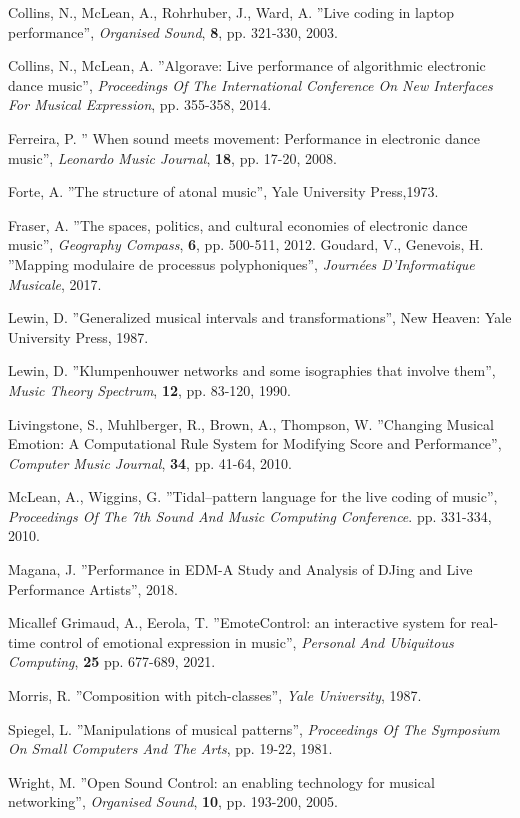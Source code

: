 \documentclass{article}
\begin{document}
\begin{thebibliography}{2}
  Collins, N., McLean, A., Rohrhuber, J., Ward, A. ''Live coding in laptop performance'',
  {\em Organised Sound}, \textbf{8}, pp. 321-330, 2003.

  Collins, N., McLean, A. 
  ''Algorave: Live performance of algorithmic electronic dance music'',
  {\em Proceedings Of The International Conference On New Interfaces For Musical Expression}, pp. 355-358, 2014.

  Ferreira, P.
  '' When sound meets movement: Performance in electronic dance music'',
   {\em Leonardo Music Journal}, \textbf{18}, pp. 17-20, 2008.

  Forte, A.
  ''The structure of atonal music'',
  Yale University Press,1973.

  Fraser, A. 
  ''The spaces, politics, and cultural economies of electronic dance music'', {\em Geography Compass}, \textbf{6}, pp. 500-511, 2012.
  Goudard, V., Genevois, H. 
  ''Mapping modulaire de processus polyphoniques'',
  {\em Journées D'Informatique Musicale}, 2017.

  Lewin, D. 
  ''Generalized musical intervals and transformations'', 
  New Heaven: Yale University Press, 1987.

  Lewin, D. 
  ''Klumpenhouwer networks and some isographies that involve them'',
  {\em Music Theory Spectrum}, \textbf{12}, pp. 83-120, 1990.

  Livingstone, S., Muhlberger, R., Brown, A., Thompson, W. 
  ''Changing Musical Emotion: A Computational Rule System for Modifying Score and Performance'', 
  {\em Computer Music Journal}, \textbf{34}, pp. 41-64, 2010.

  McLean, A., Wiggins, G. 
  ''Tidal–pattern language for the live coding of music'',
  {\em Proceedings Of The 7th Sound And Music Computing Conference}. pp. 331-334, 2010.

  Magana, J. 
  ''Performance in EDM-A Study and Analysis of DJing and Live Performance Artists'', 2018.


  Micallef Grimaud, A., Eerola, T.
  ''EmoteControl: an interactive system for real-time control of emotional expression in music'', 
  {\em Personal And Ubiquitous Computing}, \textbf{25} pp. 677-689, 2021.

  Morris, R. 
  ''Composition with pitch-classes'',
  {\em Yale University}, 1987.

  Spiegel, L. 
  ''Manipulations of musical patterns'',
   {\em Proceedings Of The Symposium On Small Computers And The Arts}, pp. 19-22, 1981.

  Wright, M. 
  ''Open Sound Control: an enabling technology for musical networking'',
  {\em Organised Sound}, \textbf{10}, pp. 193-200, 2005.
  
\end{thebibliography}
\end{document}

